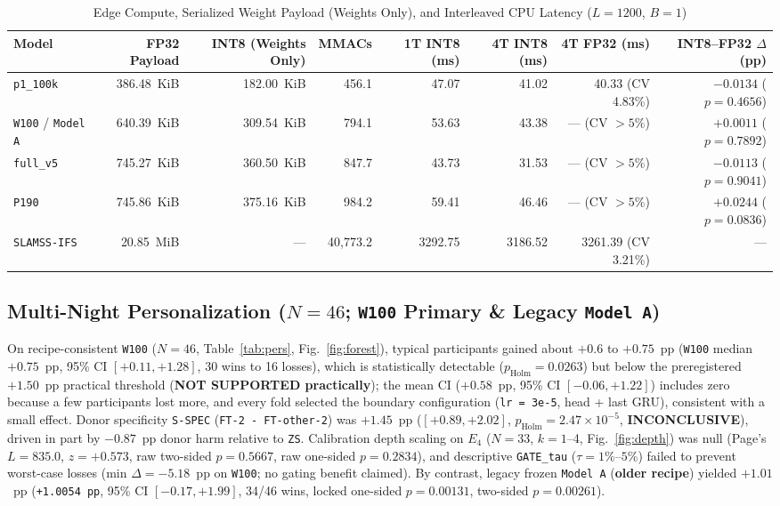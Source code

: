 \documentclass[journal]{IEEEtran}
\begin{document}
\begin{table}[!t]
\centering
\caption{Edge Compute, Serialized Weight Payload (Weights Only), and Interleaved CPU Latency ($L=1200$, $B=1$)}
\label{tab:edge}
\scriptsize
\begin{tabular}{@{}lrrrrrrr@{}}
\toprule
Model & FP32 Payload & INT8 (Weights Only) & MMACs & 1T INT8 (ms) & 4T INT8 (ms) & 4T FP32 (ms) & INT8--FP32 $\Delta$ (pp) \\
\midrule
\texttt{p1\_100k} & 386.48~KiB & 182.00~KiB & 456.1 & 47.07 & 41.02 & 40.33 (CV 4.83\%) & $-0.0134$ ($p=0.4656$) \\
\texttt{W100} / \texttt{Model A} & 640.39~KiB & 309.54~KiB & 794.1 & 53.63 & 43.38 & --- (CV $>5\%$) & $+0.0011$ ($p=0.7892$) \\
\texttt{full\_v5} & 745.27~KiB & 360.50~KiB & 847.7 & 43.73 & 31.53 & --- (CV $>5\%$) & $-0.0113$ ($p=0.9041$) \\
\texttt{P190} & 745.86~KiB & 375.16~KiB & 984.2 & 59.41 & 46.46 & --- (CV $>5\%$) & $+0.0244$ ($p=0.0836$) \\
\texttt{SLAMSS-IFS} & 20.85~MiB & --- & 40,773.2 & 3292.75 & 3186.52 & 3261.39 (CV 3.21\%) & --- \\
\bottomrule
\end{tabular}
\end{table}

\subsection{Multi-Night Personalization ($N=46$; \texttt{W100} Primary \& Legacy \texttt{Model~A})}
On recipe-consistent \texttt{W100} ($N=46$, Table~\ref{tab:pers}, Fig.~\ref{fig:forest}), typical participants gained about $+0.6$ to $+0.75$~pp (\texttt{W100} median $+0.75$~pp, 95\% CI $[+0.11, +1.28]$, 30 wins to 16 losses), which is statistically detectable ($p_{\text{Holm}}=0.0263$) but below the preregistered $+1.50$~pp practical threshold (\textbf{NOT SUPPORTED practically}); the mean CI ($+0.58$~pp, 95\% CI $[-0.06, +1.22]$) includes zero because a few participants lost more, and every fold selected the boundary configuration (\texttt{lr = 3e-5}, head + last GRU), consistent with a small effect. Donor specificity \texttt{S-SPEC} (\texttt{FT-2 - FT-other-2}) was $+1.45$~pp ($[+0.89, +2.02]$, $p_{\text{Holm}}=2.47\times 10^{-5}$, \textbf{INCONCLUSIVE}), driven in part by $-0.87$~pp donor harm relative to \texttt{ZS}. Calibration depth scaling on $E_4$ ($N=33$, $k=1$--4, Fig.~\ref{fig:depth}) was null (Page's $L=835.0$, $z=+0.573$, raw two-sided $p=0.5667$, raw one-sided $p=0.2834$), and descriptive \texttt{GATE\_tau} ($\tau=1\%\text{--}5\%$) failed to prevent worst-case losses ($\text{min }\Delta = -5.18$~pp on \texttt{W100}; no gating benefit claimed). By contrast, legacy frozen \texttt{Model~A} (\textbf{older recipe}) yielded $+1.01$~pp (\texttt{+1.0054~pp}, 95\% CI $[-0.17, +1.99]$, 34/46 wins, locked one-sided $p=0.00131$, two-sided $p=0.00261$).
\end{document}
